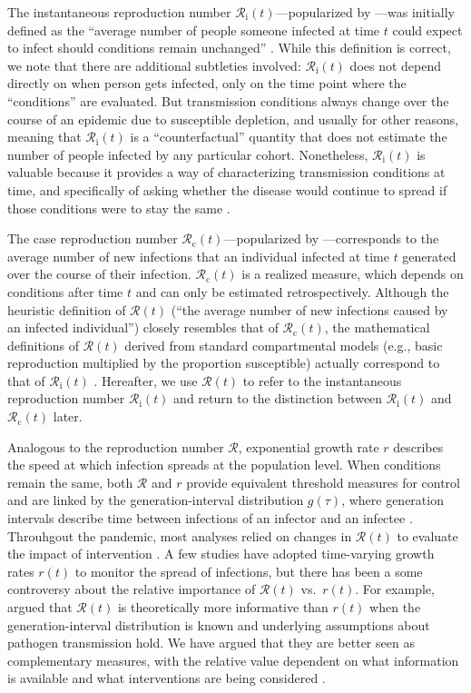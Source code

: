 \documentclass[12pt]{article}
\newcommand{\Rx}[1]{\ensuremath{{\mathcal R}_{#1}}\xspace}
\newcommand{\Rc}{\Rx{\mathrm{c}}}
\newcommand{\Ri}{\Rx{\mathrm{i}}}
\newcommand{\RR}{\ensuremath{{\mathcal R}}\xspace}
\begin{document}
The instantaneous reproduction number $\Ri(t)$---popularized by \cite{cori2013new}---was initially defined as the ``average number of people someone infected at time $t$ could expect to infect should conditions remain unchanged'' \citep{fraser2007estimating}. 
While this definition is correct, we note that there are additional subtleties involved:
$\Ri(t)$ does not depend directly on when person gets infected, only on the time point where the ``conditions'' are evaluated.
But transmission conditions always change over the course of an epidemic due to susceptible depletion, and usually for other reasons, meaning that $\Ri(t)$ is a ``counterfactual'' quantity that does not estimate the number of people infected by any particular cohort.
Nonetheless, $\Ri(t)$ is valuable because it provides a way of characterizing transmission conditions at time, and specifically of asking whether the disease would continue to spread if those conditions were to stay the same \citep{gostic2020practical}.

The case reproduction number $\Rc(t)$---popularized by \cite{wallinga2004different}---corresponds to the average number of new infections that an individual infected at time $t$ generated over the course of their infection.
$\Rc(t)$ is a realized measure, which depends on conditions after time $t$ and can only be estimated retrospectively.
Although the heuristic definition of $\RR(t)$ (``the average number of new infections caused by an infected individual'') closely resembles that of $\Rc(t)$, the mathematical definitions of $\RR(t)$ derived from standard compartmental models (e.g., basic reproduction multiplied by the proportion susceptible) actually correspond to that of $\Ri(t)$ \citep{gostic2020practical}.
Hereafter, we use $\RR(t)$ to refer to the instantaneous reproduction number $\Ri(t)$ and return to the distinction between $\Ri(t)$ and $\Rc(t)$ later.

Analogous to the reproduction number $\RR$, exponential growth rate $r$ describes the speed at which infection spreads at the population level.
When conditions remain the same, both $\RR$ and $r$ provide equivalent threshold measures for control and are linked by the generation-interval distribution $g(\tau)$, where generation intervals describe time between infections of an infector and an infectee \citep{svensson2007note}.
Throuhgout the pandemic, most analyses relied on changes in $\RR(t)$ to evaluate the impact of intervention \citep{flaxman2020estimating,brauner2021inferring}.
A few studies have adopted time-varying growth rates $r(t)$ to monitor the spread of infections, but there has been a some controversy about the relative importance of $\RR(t)$ vs.~$r(t)$.
For example, \cite{parag2022} argued that $\RR(t)$ is theoretically more informative than $r(t)$ when the generation-interval distribution is known and underlying assumptions about pathogen transmission hold.
We have argued that they are better seen as complementary measures, with the relative value dependent on what information is available and what interventions are being considered \citep{dushoff2021speed}.
\end{document}
